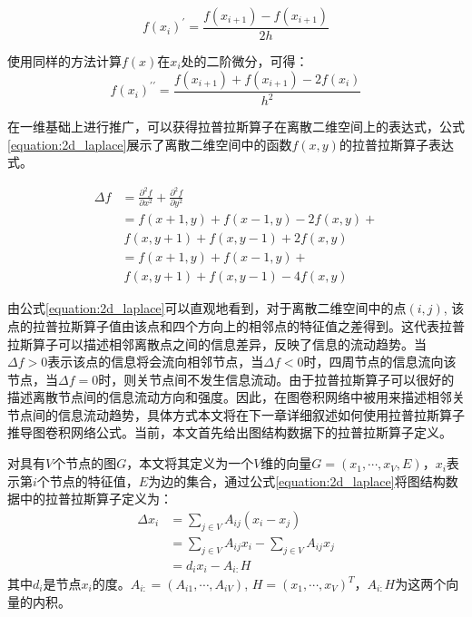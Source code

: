 \begin{equation}
    f(x_i)^{\prime} = \frac{ f(x_{i+1}) - f(x_{i+1}) }{2h} 
    \label{equation:frist_order}
\end{equation}

使用同样的方法计算$f(x)$在$x_i$处的二阶微分，可得：
\begin{equation}
    f(x_i)^{\prime \prime} = \frac{ f(x_{i+1}) + f(x_{i+1}) - 2f(x_i) }{h^2} 
    \label{equation:second_order}
\end{equation}

在一维基础上进行推广，可以获得拉普拉斯算子在离散二维空间上的表达式，公式\ref{equation:2d_laplace}展示了离散二维空间中的函数$f(x,y)$的拉普拉斯算子表达式。

\begin{equation}
    \begin{aligned}
        \Delta f &= \frac{\partial^2 f}{\partial x^2} + \frac{\partial^2 f}{\partial y^2} \\
        &= f(x+1, y) + f(x-1, y) - 2f(x, y) + \\
        &\ f(x, y+1) + f(x, y-1) + 2f(x, y) \\
        &= f(x+1, y) + f(x-1, y) + \\
        &\ f(x, y+1) + f(x, y-1) - 4f(x,y)
    \end{aligned}
    \label{equation:2d_laplace}
\end{equation}

由公式\ref{equation:2d_laplace}可以直观地看到，对于离散二维空间中的点$(i,j)$, 该点的拉普拉斯算子值由该点和四个方向上的相邻点的特征值之差得到。这代表拉普拉斯算子可以描述相邻离散点之间的信息差异，反映了信息的流动趋势。当$\Delta f > 0$表示该点的信息将会流向相邻节点，当$\Delta f < 0$时，四周节点的信息流向该节点，当$\Delta f = 0$时，则关节点间不发生信息流动。由于拉普拉斯算子可以很好的描述离散节点间的信息流动方向和强度。因此，在图卷积网络中被用来描述相邻关节点间的信息流动趋势，具体方式本文将在下一章详细叙述如何使用拉普拉斯算子推导图卷积网络公式。当前，本文首先给出图结构数据下的拉普拉斯算子定义。

对具有$V$个节点的图$G$，本文将其定义为一个$V$维的向量$G=(x_1, \cdots, x_V, E)$，$x_i$表示第$i$个节点的特征值，$E$为边的集合，通过公式\ref{equation:2d_laplace}将图结构数据中的拉普拉斯算子定义为：
\begin{equation}
    \begin{aligned}
        \Delta x_i &= \sum_{j \in V}A_{ij}(x_i - x_j) \\
        &=\sum_{j \in V}A_{ij}x_i - \sum_{j \in V}A_{ij}x_j \\
        &= d_i x_i - A_{i:}H
    \end{aligned}
    \label{equation:nd_laplace}
\end{equation}
其中$d_i$是节点$x_i$的度。$A_{i:} = (A_{i1},\cdots, A_{iV})$, $H = (x_1, \cdots, x_V)^T$，$A_{i:}H$为这两个向量的内积。

